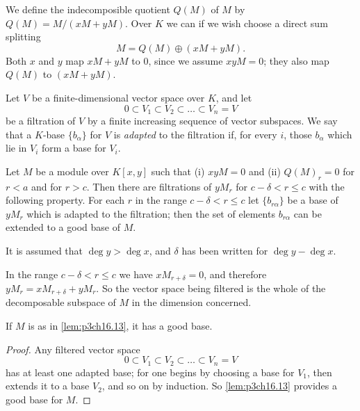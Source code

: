 \documentclass[../main]{subfiles}
\begin{document}
We define the indecomposible quotient $Q(M)$ of $M$ by $Q(M) = M/(x M +y M)$. Over $K$ we can if we wish choose a direct sum splitting $$M = Q(M) \oplus (x M + y M).$$ Both $x$ and $y$ map $x M + y M$ to $0$, since we assume $x y M = 0$; they also map $Q(M)$ to $(x M + y M)$.

Let $V$ be a finite-dimensional vector space over $K$, and let $$0 \subset V_1 \subset V_2 \subset \ldots \subset V_n = V$$ be a filtration of $V$ by a finite increasing sequence of vector subspaces. We say that a $K$-base $\{b_\alpha\}$ for $V$ is \emph{adapted} to the filtration if, for every $i$, those $b_\alpha$ which lie in $V_i$ form a base for $V_i$.

\begin{lemma}
\label{lem:p3ch16.13}
Let $M$ be a module over $K[x, y]$ such that (i) $xy M = 0$ and (ii) $Q(M)_r = 0$ for $r < a$ and for $r > c$. Then there are filtrations of $y M_r$ for $c - \delta < r \le c$ with the following property. For each $r$ in the range $c - \delta < r \le c$ let $\{b_{r \alpha}\}$ be a base of $y M_r$ which is adapted to the filtration; then the set of elements $b_{r \alpha}$ can be extended to a good base of $M$. 
\end{lemma}

\begin{notes}
It is assumed that $\deg y > \deg x$, and $\delta$ has been written for $\deg y - \deg x$.
\end{notes}

\begin{notes}
In the range $c - \delta < r \le c$ we have $x M_{r + \delta} = 0$, and therefore $y M_r = x M_{r + \delta} + y M_r$. So the vector space being filtered is the whole of the decomposable subspace of $M$ in the dimension concerned.
\end{notes}

\begin{corollary}
\label{cor:p3ch16.14}
If $M$ is as in \ref{lem:p3ch16.13}, it has a good base. 
\end{corollary}

\begin{proof}
Any filtered vector space $$0 \subset V_1 \subset V_2 \subset \ldots \subset V_n = V$$ has at least one adapted base; for one begins by choosing a base for $V_1$, then extends it to a base $V_2$, and so on by induction. So \ref{lem:p3ch16.13} provides a good base for $M$.
\end{proof}
\end{document}
